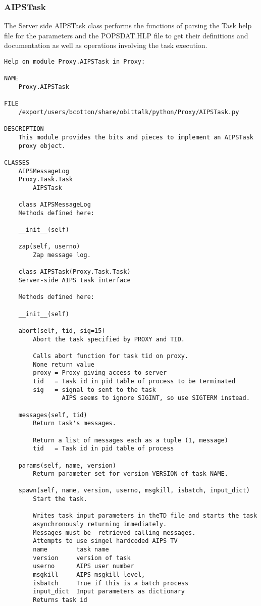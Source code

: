 \documentclass[11pt]{report}
\begin{document}
\subsubsection{AIPSTask}
The Server side AIPSTask class performs the functions of parsing the
Task help file for the parameters and the POPSDAT.HLP file to get
their definitions and documentation as well as operations involving
the task execution. 
\begin{verbatim}
Help on module Proxy.AIPSTask in Proxy:

NAME
    Proxy.AIPSTask

FILE
    /export/users/bcotton/share/obittalk/python/Proxy/AIPSTask.py

DESCRIPTION
    This module provides the bits and pieces to implement an AIPSTask
    proxy object.

CLASSES
    AIPSMessageLog
    Proxy.Task.Task
        AIPSTask
    
    class AIPSMessageLog
    Methods defined here:
    
    __init__(self)
    
    zap(self, userno)
        Zap message log.
    
    class AIPSTask(Proxy.Task.Task)
    Server-side AIPS task interface
    
    Methods defined here:
    
    __init__(self)
    
    abort(self, tid, sig=15)
        Abort the task specified by PROXY and TID.
        
        Calls abort function for task tid on proxy.
        None return value
        proxy = Proxy giving access to server
        tid   = Task id in pid table of process to be terminated
        sig   = signal to sent to the task
                AIPS seems to ignore SIGINT, so use SIGTERM instead.
    
    messages(self, tid)
        Return task's messages.
        
        Return a list of messages each as a tuple (1, message)
        tid   = Task id in pid table of process
    
    params(self, name, version)
        Return parameter set for version VERSION of task NAME.
    
    spawn(self, name, version, userno, msgkill, isbatch, input_dict)
        Start the task.
        
        Writes task input parameters in theTD file and starts the task
        asynchronously returning immediately.
        Messages must be  retrieved calling messages.
        Attempts to use singel hardcoded AIPS TV
        name        task name
        version     version of task
        userno      AIPS user number
        msgkill     AIPS msgkill level,
        isbatch     True if this is a batch process
        input_dict  Input parameters as dictionary
        Returns task id
    

\end{verbatim}
\end{document}
